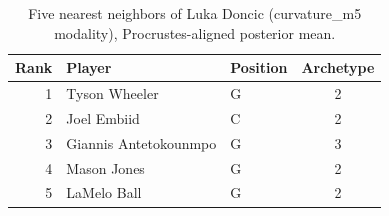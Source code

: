 \begin{table}[htbp]
  \centering\small
  \begin{tabular}{rllc}
    \toprule
    Rank & Player & Position & Archetype \\
    \midrule
    1 & Tyson Wheeler & G & 2 \\
    2 & Joel Embiid & C & 2 \\
    3 & Giannis Antetokounmpo & G & 3 \\
    4 & Mason Jones & G & 2 \\
    5 & LaMelo Ball & G & 2 \\
    \bottomrule
  \end{tabular}
  \caption{Five nearest neighbors of Luka Doncic (curvature_m5 modality), Procrustes-aligned posterior mean.}
  \label{tab:Luka_Doncic_neighbors_curvature_m5}
\end{table}

